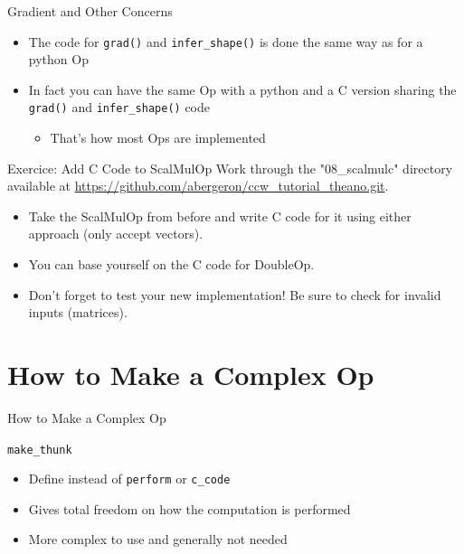 \documentclass[utf8x]{beamer}
\newcommand{\code}[1]{\lstinline[emph={[2]}]|#1|}
\begin{document}
\begin{frame}{Gradient and Other Concerns}
\begin{itemize}
\item The code for \code{grad()} and \code{infer_shape()} is done the same way as for a python Op
\item In fact you can have the same Op with a python and a C version sharing the \code{grad()} and \code{infer_shape()} code
\begin{itemize}
\item That's how most Ops are implemented
\end{itemize}
\end{itemize}
\end{frame}

\begin{frame}{Exercice: Add C Code to ScalMulOp}
Work through the "08\_scalmulc" directory available at \url{https://github.com/abergeron/ccw_tutorial_theano.git}.
\begin{itemize}
\item Take the ScalMulOp from before and write C code for it using either approach (only accept vectors).
\item You can base yourself on the C code for DoubleOp.
\item Don't forget to test your new implementation! Be sure to check for invalid inputs (matrices).
\end{itemize}
\end{frame}

\section{How to Make a Complex Op}

\begin{frame}[plain]{}
\begin{center}
\Huge How to Make a Complex Op
\end{center}
\end{frame}

\begin{frame}{\code{make_thunk}}

\begin{itemize}
\item Define instead of \code{perform} or \code{c_code}
\item Gives total freedom on how the computation is performed
\item More complex to use and generally not needed
\end{itemize}
\end{frame}
\end{document}
